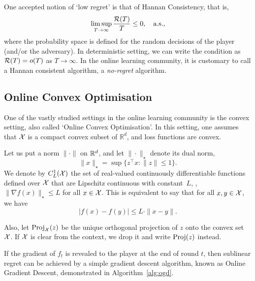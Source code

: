 One accepted notion of `low regret' is that of Hannan Consistency, that is, 
\[
    \limsup_{T\to\infty} \frac{\mathcal{R}(T)}{T} \leq 0, \quad \text{a.s.},
\]
where the probability space is defined for the random decisions of the player (and/or the adversary). In deterministic setting, we can write the condition as $\mathcal{R}(T) = o(T)$ as $T\to\infty$. In the online learning community, it is customary to call a Hannan consistent algorithm, a \emph{no-regret} algorithm.

\subsection{Online Convex Optimisation}
One of the vastly studied settings in the online learning community is the convex setting, also called `Online Convex Optimisation'. In this setting, one assumes that $\mathcal{X}$ is a compact convex subset of $\mathbb{R}^d$, and loss functions are convex. 

Let us put a norm $\|\cdot\|$ on $\mathbb{R}^d$, and let $\|\cdot\|_\star$ denote its dual norm, \ie
\[
    \|x\|_\star = \sup \{ z^\top x : \|z\| \leq 1 \}.
\]
We denote by $C^1_{L}(\mathcal{X})$ the set of real-valued continuously differentiable functions defined over $\mathcal{X}$ that are Lipschitz continuous with constant~$L$, \ie, $\|\nabla f(x)\|_\star \leq L$ for all $x\in \mathcal{X}$. This is equivalent to say that for all $x, y\in \mathcal{X}$, we have
\[
    |f(x) - f(y)| \leq L\cdot\|x-y\|.
\]


Also, let $\operatorname{Proj}_{\mathcal{X}}(z)$ be the unique orthogonal projection of $z$ onto the convex set $\mathcal{X}$. If $\mathcal{X}$ is clear from the context, we drop it and write $\operatorname{Proj}(z)$ instead.

If the gradient of $f_t$ is revealed to the player at the end of round $t$, then sublinear regret can be achieved by a simple gradient descent algorithm, known as Online Gradient Descent, demonstrated in Algorithm~\ref{alg:ogd}. 

